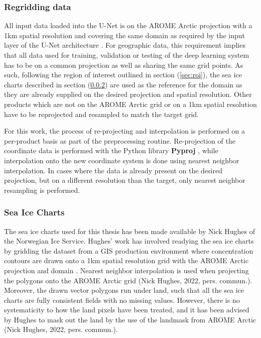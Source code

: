 \documentclass[../main/thesis]{subfiles}
\begin{document}
\subsubsection{Regridding data}
\label{sec:regrid}
All input data loaded into the U-Net is on the AROME Arctic projection with a 1km spatial resolution and covering the same domain as required by the input layer of the U-Net architecture \citep{Ronneberger2015}. For geographic data, this requirement implies that all data used for training, validation or testing of the deep learning system has to be on a common projection as well as sharing the same grid points. As such, following the region of interest outlined in section (\ref{sec:roi}), the sea ice charts described in section (\ref{sec:data_seaicecharts}) are used as the reference for the domain as they are already supplied on the desired projection and spatial resolution. Other products which are not on the AROME Arctic grid \citep{Mueller2017} or on a 1km spatial resolution \citep{Dinessen2020} have to be reprojected and resampled to match the target grid.

For this work, the process of re-projecting and interpolation is performed on a per-product basis as part of the preprocessing routine. Re-projection of the coordinate data is performed with the Python library \textbf{Pyproj} \citep{Snow2022}, while interpolation onto the new coordinate system is done using nearest neighbor interpolation. In cases where the data is already present on the desired projection, but on a different resolution than the target, only nearest neighbor resampling is performed.

\subsubsection{Sea Ice Charts}
\label{sec:data_seaicecharts}
The sea ice charts used for this thesis has been made available by Nick Hughes of the Norwegian Ice Service. Hughes' work has involved readying the sea ice charts by gridding the dataset from a GIS production environment \citep{Dinessen2020} where concentration contours are drawn onto a 1km spatial resolution grid with the AROME Arctic projection and domain \citep{Mueller2017}. Nearest neighbor interpolation is used when projecting the polygons onto the AROME Arctic grid (Nick Hughes, 2022, pers. commun.). Moreover, the drawn vector polygons run under land, such that all the sea ice charts are fully consistent fields with no missing values. However, there is no systematicity to how the land pixels have been treated, and it has been advised by Hughes to mask out the land by the use of the landmask from AROME Arctic (Nick Hughes, 2022, pers. commun.).
\end{document}
